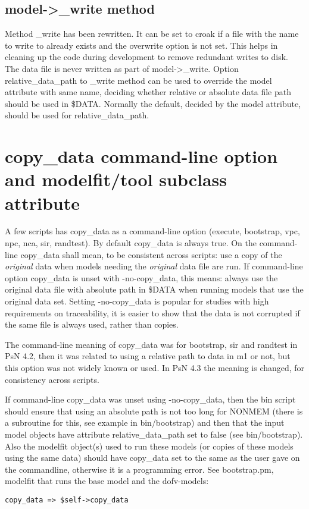 \subsection{model->\_write method}
Method \_write has been rewritten. 
It can be set to croak if a file with the name to write to already exists and the overwrite option is not set. This
helps in cleaning up the code during development
to remove redundant writes to disk.
The data file is never written as part of model->\_write.
Option relative\_data\_path to \_write method can be used to override the model attribute with same name,
deciding whether relative or absolute data file path should be used in \$DATA.
Normally the default, decided by the model attribute, should be used for relative\_data\_path.

\section{copy\_data command-line option and modelfit/tool subclass attribute}
A few scripts has copy\_data as a command-line option (execute, bootstrap, vpc, npc, nca, sir, randtest). 
By default copy\_data is always true. On the
command-line copy\_data shall mean, to be consistent across scripts: 
use a copy of the \emph{original} data when models needing the \emph{original}
data file are run. If command-line option copy\_data is unset with -no-copy\_data, this means: always use the 
original data file with absolute path in \$DATA when running models that use the original data set. Setting -no-copy\_data
is popular for studies with high requirements on traceability, it is easier to show that the data is not corrupted 
if the same file is always used, rather than copies.

The command-line meaning of copy\_data was for bootstrap, sir and randtest in PsN 4.2, then it was related to using a relative path 
to data in m1 or not, but this option was not widely known or used. In PsN 4.3 the meaning is changed, for consistency across scripts.

If command-line copy\_data was unset using -no-copy\_data, 
then the bin script should ensure that using an absolute path is not too long for NONMEM (there is a subroutine for this, see example in bin/bootstrap)
and then that the input model objects have attribute relative\_data\_path set to false (see bin/bootstrap).
Also the modelfit object(s) used to run these models (or copies of these models using the same data) 
should have copy\_data set to the same as the user gave on the commandline, otherwise it is a programming error. See bootstrap.pm, 
modelfit that runs the base model and the dofv-models: 
\begin{verbatim}
copy_data => $self->copy_data
\end{verbatim}

